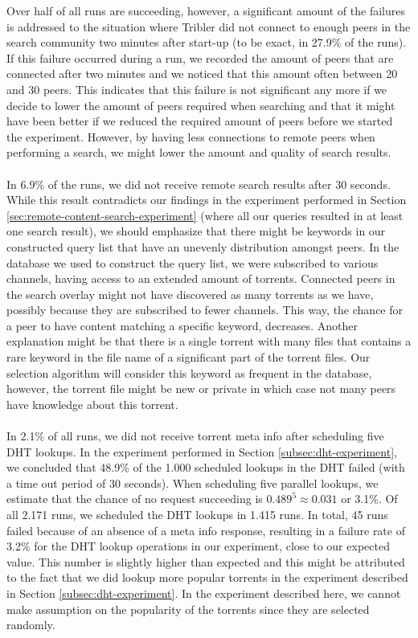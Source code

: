 \noindent Over half of all runs are succeeding, however, a significant amount of the failures is addressed to the situation where Tribler did not connect to enough peers in the search community two minutes after start-up (to be exact, in 27.9\% of the runs). If this failure occurred during a run, we recorded the amount of peers that are connected after two minutes and we noticed that this amount often between 20 and 30 peers. This indicates that this failure is not significant any more if we decide to lower the amount of peers required when searching and that it might have been better if we reduced the required amount of peers before we started the experiment. However, by having less connections to remote peers when performing a search, we might lower the amount and quality of search results.\\\\
In 6.9\% of the runs, we did not receive remote search results after 30 seconds. While this result contradicts our findings in the experiment performed in Section \ref{sec:remote-content-search-experiment} (where all our queries resulted in at least one search result), we should emphasize that there might be keywords in our constructed query list that have an unevenly distribution amongst peers. In the database we used to construct the query list, we were subscribed to various channels, having access to an extended amount of torrents. Connected peers in the search overlay might not have discovered as many torrents as we have, possibly because they are subscribed to fewer channels. This way, the chance for a peer to have content matching a specific keyword, decreases. Another explanation might be that there is a single torrent with many files that contains a rare keyword in the file name of a significant part of the torrent files. Our selection algorithm will consider this keyword as frequent in the database, however, the torrent file might be new or private in which case not many peers have knowledge about this torrent.\\\\
In 2.1\% of all runs, we did not receive torrent meta info after scheduling five DHT lookups. In the experiment performed in Section \ref{subsec:dht-experiment}, we concluded that 48.9\% of the 1.000 scheduled lookups in the DHT failed (with a time out period of 30 seconds). When scheduling five parallel lookups, we estimate that the chance of no request succeeding is $ 0.489^5 \approx 0.031 $ or 3.1\%. Of all 2.171 runs, we scheduled the DHT lookups in 1.415 runs. In total, 45 runs failed because of an absence of a meta info response, resulting in a failure rate of 3.2\% for the DHT lookup operations in our experiment, close to our expected value. This number is slightly higher than expected and this might be attributed to the fact that we did lookup more popular torrents in the experiment described in Section \ref{subsec:dht-experiment}. In the experiment described here, we cannot make assumption on the popularity of the torrents since they are selected randomly.\\\\
